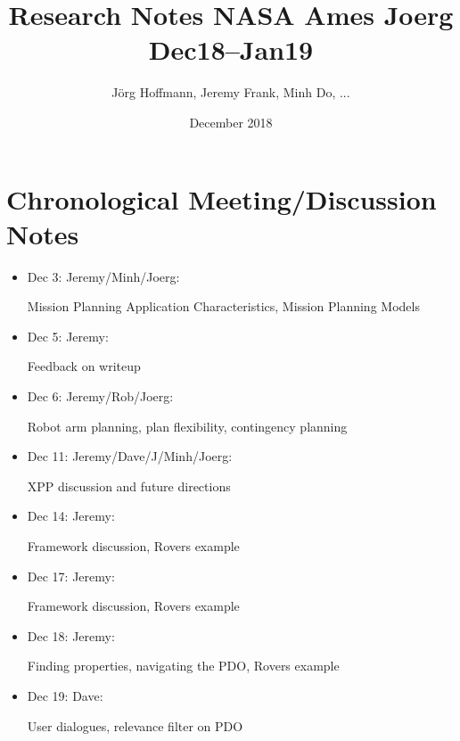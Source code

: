 \documentclass[fontsize=11pt]{scrartcl}
\title{Research Notes NASA Ames Joerg Dec18--Jan19}
\author{J\"org Hoffmann, Jeremy Frank, Minh Do, ... }
\date{December 2018}
\begin{document}
\maketitle



















\appendix



%


\section{Chronological Meeting/Discussion Notes}

\begin{itemize}
\item Dec 3: Jeremy/Minh/Joerg: 

    Mission Planning Application Characteristics, Mission Planning Models

\item Dec 5: Jeremy: 

    Feedback on writeup
    
\item Dec 6: Jeremy/Rob/Joerg: 

    Robot arm planning, plan flexibility, contingency planning
        
\item Dec 11: Jeremy/Dave/J/Minh/Joerg: 

    XPP discussion and future directions

\item Dec 14: Jeremy:

  Framework discussion, Rovers example

\item Dec 17: Jeremy:

  Framework discussion, Rovers example

\item Dec 18: Jeremy:

  Finding properties, navigating the PDO, Rovers example

\item Dec 19: Dave:

  User dialogues, relevance filter on PDO

\end{itemize}
\end{document}
